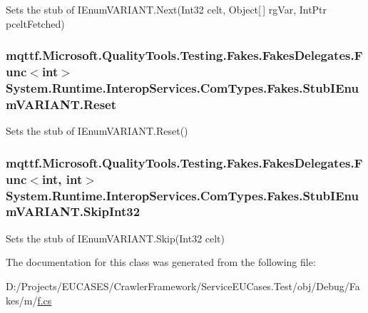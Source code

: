 Sets the stub of I\-Enum\-V\-A\-R\-I\-A\-N\-T.\-Next(\-Int32 celt, Object\mbox{[}$\,$\mbox{]} rg\-Var, Int\-Ptr pcelt\-Fetched)

\hypertarget{class_system_1_1_runtime_1_1_interop_services_1_1_com_types_1_1_fakes_1_1_stub_i_enum_v_a_r_i_a_n_t_ad6eab99dfc73a9ef18b51ebeb388c678}{
\subsubsection[{Reset}]{\setlength{\rightskip}{0pt plus 5cm}mqttf.\-Microsoft.\-Quality\-Tools.\-Testing.\-Fakes.\-Fakes\-Delegates.\-Func$<$int$>$ System.\-Runtime.\-Interop\-Services.\-Com\-Types.\-Fakes.\-Stub\-I\-Enum\-V\-A\-R\-I\-A\-N\-T.\-Reset}}\label{class_system_1_1_runtime_1_1_interop_services_1_1_com_types_1_1_fakes_1_1_stub_i_enum_v_a_r_i_a_n_t_ad6eab99dfc73a9ef18b51ebeb388c678}


Sets the stub of I\-Enum\-V\-A\-R\-I\-A\-N\-T.\-Reset()

\hypertarget{class_system_1_1_runtime_1_1_interop_services_1_1_com_types_1_1_fakes_1_1_stub_i_enum_v_a_r_i_a_n_t_af07066a541814d3a8bcbefe66ab959a7}{
\subsubsection[{Skip\-Int32}]{\setlength{\rightskip}{0pt plus 5cm}mqttf.\-Microsoft.\-Quality\-Tools.\-Testing.\-Fakes.\-Fakes\-Delegates.\-Func$<$int, int$>$ System.\-Runtime.\-Interop\-Services.\-Com\-Types.\-Fakes.\-Stub\-I\-Enum\-V\-A\-R\-I\-A\-N\-T.\-Skip\-Int32}}\label{class_system_1_1_runtime_1_1_interop_services_1_1_com_types_1_1_fakes_1_1_stub_i_enum_v_a_r_i_a_n_t_af07066a541814d3a8bcbefe66ab959a7}


Sets the stub of I\-Enum\-V\-A\-R\-I\-A\-N\-T.\-Skip(\-Int32 celt)



The documentation for this class was generated from the following file\-:\begin{DoxyCompactItemize}
\item 
D\-:/\-Projects/\-E\-U\-C\-A\-S\-E\-S/\-Crawler\-Framework/\-Service\-E\-U\-Cases.\-Test/obj/\-Debug/\-Fakes/m/\hyperlink{m_2f_8cs}{f.\-cs}\end{DoxyCompactItemize}
